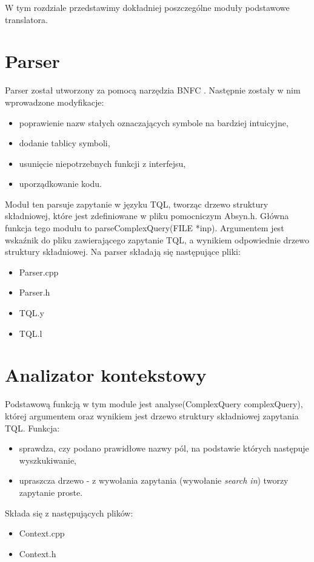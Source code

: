 W tym rozdziale przedstawimy dokładniej poszczególne moduły podstawowe translatora.

\section{Parser}
Parser został utworzony za pomocą narzędzia BNFC \cite{bnfc}. Następnie zostały w nim wprowadzone modyfikacje:
\begin{itemize}
\item poprawienie nazw stałych oznaczających symbole na bardziej intuicyjne,
\item dodanie tablicy symboli,
\item usunięcie niepotrzebnych funkcji z interfejsu,
\item uporządkowanie kodu.
\end{itemize}
Moduł ten parsuje zapytanie w języku TQL, tworząc drzewo struktury składniowej, które jest zdefiniowane w pliku pomocniczym Absyn.h. Główna funkcja tego modułu to parseComplexQuery(FILE *inp). Argumentem jest wskaźnik do pliku zawierającego zapytanie TQL, a wynikiem odpowiednie drzewo struktury składniowej.
Na parser składają się następujące pliki:
\begin{itemize}
 \item Parser.cpp
 \item Parser.h
 \item TQL.y %
 \item TQL.l %
\end{itemize}

\section{Analizator kontekstowy}
Podstawową funkcją w tym module jest analyse(ComplexQuery complexQuery), której argumentem oraz wynikiem jest drzewo struktury składniowej zapytania TQL. Funkcja:
\begin{itemize}
 \item sprawdza, czy podano prawidłowe nazwy pól, na podstawie których następuje wyszkukiwanie,  %
\item upraszcza drzewo - z wywołania zapytania (wywołanie \textit{search in}) tworzy zapytanie proste.
\end{itemize}
Składa się z następujących plików:
\begin{itemize}
 \item Context.cpp
 \item Context.h
\end{itemize}

